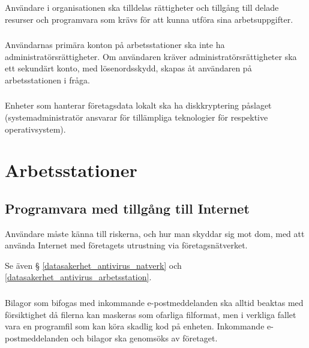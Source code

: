 \documentclass[a4paper,12pt]{article}
\begin{document}
\subsubsection{}

Användare i organisationen ska tilldelas rättigheter och tillgång till delade resurser och programvara som krävs för att kunna utföra sina arbetsuppgifter.

\subsubsection{}

Användarnas primära konton på arbetsstationer ska inte ha administratörsrättigheter. Om användaren kräver administratörsrättigheter ska ett sekundärt konto, med lösenordsskydd, skapas åt användaren på arbetsstationen i fråga.

\subsubsection{}

Enheter som hanterar företagsdata lokalt ska ha diskkryptering påslaget (systemadministratör ansvarar för tillämpliga teknologier för respektive operativsystem).

\section{Arbetsstationer}

\subsection{Programvara med tillgång till Internet}

Användare måste känna till riskerna, och hur man skyddar sig mot dom, med att använda Internet med företagets utrustning via företagsnätverket.

Se även § \ref{datasakerhet_antivirus_natverk} och \ref{datasakerhet_antivirus_arbetsstation}.

\subsubsection{}

Bilagor som bifogas med inkommande e-postmeddelanden ska alltid beaktas med försiktighet då filerna kan maskeras som ofarliga filformat, men i verkliga fallet vara en programfil som kan köra skadlig kod på enheten. Inkommande e-postmeddelanden och bilagor ska genomsöks av företaget.
\end{document}
